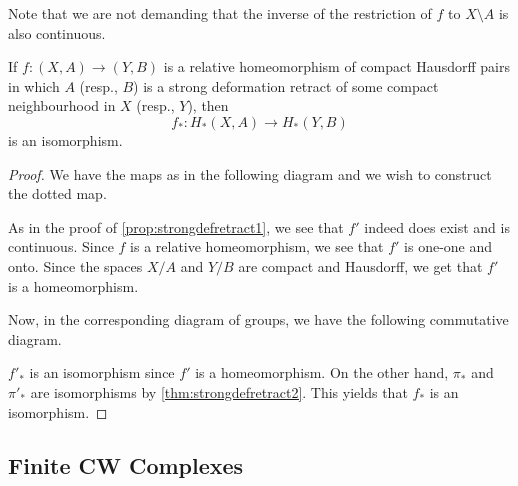 \documentclass[12pt]{article}
\begin{document}
Note that we are not demanding that the inverse of the restriction of $f$ to $X\setminus A$ is also continuous.

\begin{thm} \label{thm:relativehomeo}
	If $f:(X, A) \to (Y, B)$ is a relative homeomorphism of compact Hausdorff pairs in which $A$ (resp., $B$) is a strong deformation retract of some compact neighbourhood in $X$ (resp., $Y$), then
	\begin{equation*} 
		f_*:H_*(X, A) \to H_*(Y, B)
	\end{equation*}
	is an isomorphism.
\end{thm}
\begin{proof} 
	We have the maps as in the following diagram and we wish to construct the dotted map.
	\begin{center}
	\end{center}
	As in the proof of \cref{prop:strongdefretract1}, we see that $f'$ indeed does exist and is continuous. Since $f$ is a relative homeomorphism, we see that $f'$ is one-one and onto. Since the spaces $X/A$ and $Y/B$ are compact and Hausdorff, we get that $f'$ is a homeomorphism.

	Now, in the corresponding diagram of groups, we have the following commutative diagram.
	\begin{center}
	\end{center}
	$f'_*$ is an isomorphism since $f'$ is a homeomorphism. On the other hand, $\pi_*$ and $\pi'_*$ are isomorphisms by \cref{thm:strongdefretract2}. This yields that $f_*$ is an isomorphism.
\end{proof}

\subsection{Finite CW Complexes}
\end{document}
